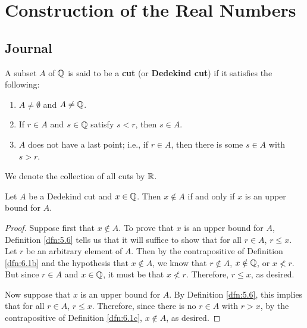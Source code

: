 \documentclass[../main.tex]{subfiles}
\begin{document}
\chapter{Construction of the Real Numbers}\label{sct:6}
\section{Journal}
\begin{definition}\label{dfn:6.1}
    A subset $A$ of $\mathbb{Q}$ is said to be a \textbf{cut} (or \textbf{Dedekind cut}) if it satisfies the following:
    \begin{enumerate}[label={(\alph*)},ref={\thedefinition\alph*}]
        \item \label{dfn:6.1a}$A\neq\emptyset$ and $A\neq\mathbb{Q}$.
        \item \label{dfn:6.1b}If $r\in A$ and $s\in\mathbb{Q}$ satisfy $s<r$, then $s\in A$.
        \item \label{dfn:6.1c}$A$ does not have a last point; i.e., if $r\in A$, then there is some $s\in A$ with $s>r$.
    \end{enumerate}
    We denote the collection of all cuts by $\mathbb{R}$.
\end{definition}

\begin{lemma}\label{lem:6.2}
    Let $A$ be a Dedekind cut and $x\in\mathbb{Q}$. Then $x\notin A$ if and only if $x$ is an upper bound for $A$.
    \begin{proof}
        Suppose first that $x\notin A$. To prove that $x$ is an upper bound for $A$, Definition \ref{dfn:5.6} tells us that it will suffice to show that for all $r\in A$, $r\leq x$. Let $r$ be an arbitrary element of $A$. Then by the contrapositive of Definition \ref{dfn:6.1b} and the hypothesis that $x\notin A$, we know that $r\notin A$, $x\notin\mathbb{Q}$, or $x\not<r$. But since $r\in A$ and $x\in\mathbb{Q}$, it must be that $x\not<r$. Therefore, $r\leq x$, as desired.\par
        Now suppose that $x$ is an upper bound for $A$. By Definition \ref{dfn:5.6}, this implies that for all $r\in A$, $r\leq x$. Therefore, since there is no $r\in A$ with $r>x$, by the contrapositive of Definition \ref{dfn:6.1c}, $x\notin A$, as desired.
    \end{proof}
\end{lemma}
\end{document}
